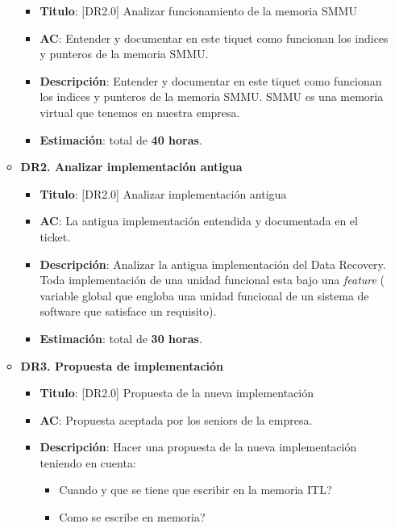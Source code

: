 \documentclass[12pt]{article}
\begin{document}
\begin{itemize}
\begin{itemize}
                \begin{itemize}
                    \item \textbf{Titulo}: [DR2.0] Analizar funcionamiento de la memoria SMMU
                    \item \textbf{AC}: Entender y documentar en este tiquet como funcionan los indices y punteros de la memoria SMMU.
                    \item \textbf{Descripción}: Entender y documentar en este tiquet como funcionan los indices y punteros de la memoria SMMU. SMMU es una memoria virtual que tenemos en nuestra empresa.
                    \item \textbf{Estimación}: total de \textbf{40 horas}.
                \end{itemize}
            \item \textbf{DR2. Analizar implementación antigua}
                \begin{itemize}
                    \item \textbf{Titulo}: [DR2.0] Analizar implementación antigua
                    \item \textbf{AC}: La antigua implementación entendida y documentada en el ticket.
                    \item \textbf{Descripción}: Analizar la antigua implementación del Data Recovery. Toda implementación de una unidad funcional esta bajo una \textit{feature} ( variable global que engloba una unidad funcional de un sistema de software que satisface un requisito). 
                    \item \textbf{Estimación}: total de \textbf{30 horas}.
                \end{itemize}
            \item \textbf{DR3. Propuesta de implementación}
                \begin{itemize}
                    \item \textbf{Titulo}: [DR2.0] Propuesta de la nueva implementación
                    \item \textbf{AC}: Propuesta aceptada por los seniors de la empresa. 
                    \item \textbf{Descripción}: Hacer una propuesta de la nueva implementación teniendo en cuenta:
                        \begin{itemize}
                            \item Cuando y que se tiene que escribir en la memoria ITL?
                            \item Como se escribe en memoria?

\end{itemize}
\end{itemize}
\end{itemize}
\end{itemize}
\end{document}
